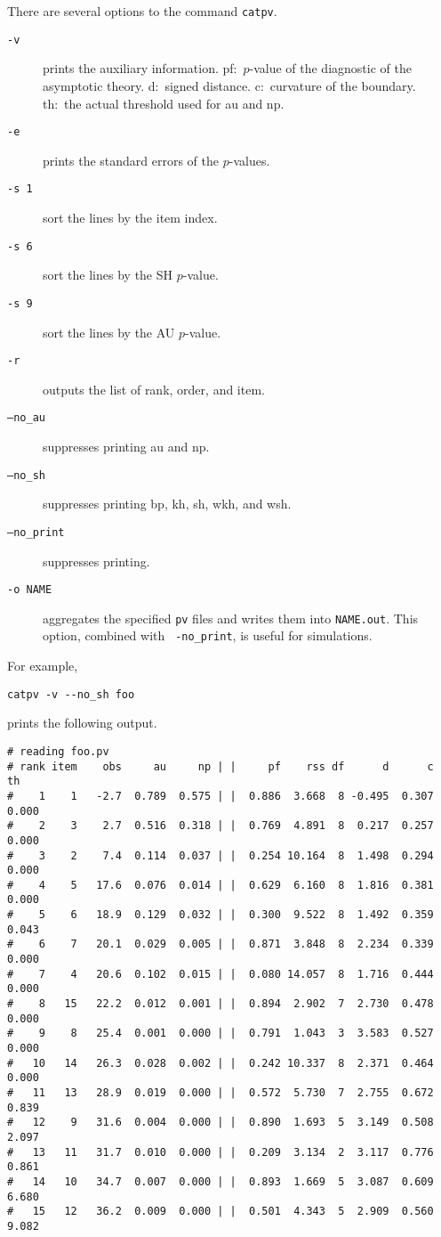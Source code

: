 \documentclass[12pt]{article}
\begin{document}
There are several options to the command {\tt catpv}. 
\begin{description}
 \item[\tt -v] prints the auxiliary information. pf:~$p$-value of the
	    diagnostic of the asymptotic theory. d:~signed
	    distance. c:~curvature of the boundary. th:~the actual
	    threshold used for au and np.
 \item[\tt -e] prints the standard errors of the $p$-values.
 \item[\tt -s 1] sort the lines by the item index.
 \item[\tt -s 6] sort the lines by the SH $p$-value.
 \item[\tt -s 9] sort the lines by the AU $p$-value.
 \item[\tt -r] outputs the list of rank, order, and item.
 \item[\tt --no{\_}au]  suppresses printing au and np.
 \item[\tt --no{\_}sh]  suppresses printing bp, kh, sh, wkh, and wsh.
 \item[\tt --no{\_}print]  suppresses printing.
 \item[\tt -o NAME] aggregates the specified {\tt pv} files and writes
	    them into {\tt NAME.out}. This option, combined with {\tt
	    -no{\_}print}, is useful for simulations.
\end{description}
For example,
\begin{verbatim}
catpv -v --no_sh foo
\end{verbatim}
prints the following output.
{\small \begin{verbatim}
# reading foo.pv
# rank item    obs     au     np | |     pf    rss df      d      c     th
#    1    1   -2.7  0.789  0.575 | |  0.886  3.668  8 -0.495  0.307  0.000
#    2    3    2.7  0.516  0.318 | |  0.769  4.891  8  0.217  0.257  0.000
#    3    2    7.4  0.114  0.037 | |  0.254 10.164  8  1.498  0.294  0.000
#    4    5   17.6  0.076  0.014 | |  0.629  6.160  8  1.816  0.381  0.000
#    5    6   18.9  0.129  0.032 | |  0.300  9.522  8  1.492  0.359  0.043
#    6    7   20.1  0.029  0.005 | |  0.871  3.848  8  2.234  0.339  0.000
#    7    4   20.6  0.102  0.015 | |  0.080 14.057  8  1.716  0.444  0.000
#    8   15   22.2  0.012  0.001 | |  0.894  2.902  7  2.730  0.478  0.000
#    9    8   25.4  0.001  0.000 | |  0.791  1.043  3  3.583  0.527  0.000
#   10   14   26.3  0.028  0.002 | |  0.242 10.337  8  2.371  0.464  0.000
#   11   13   28.9  0.019  0.000 | |  0.572  5.730  7  2.755  0.672  0.839
#   12    9   31.6  0.004  0.000 | |  0.890  1.693  5  3.149  0.508  2.097
#   13   11   31.7  0.010  0.000 | |  0.209  3.134  2  3.117  0.776  0.861
#   14   10   34.7  0.007  0.000 | |  0.893  1.669  5  3.087  0.609  6.680
#   15   12   36.2  0.009  0.000 | |  0.501  4.343  5  2.909  0.560  9.082
\end{verbatim}}
\end{document}
